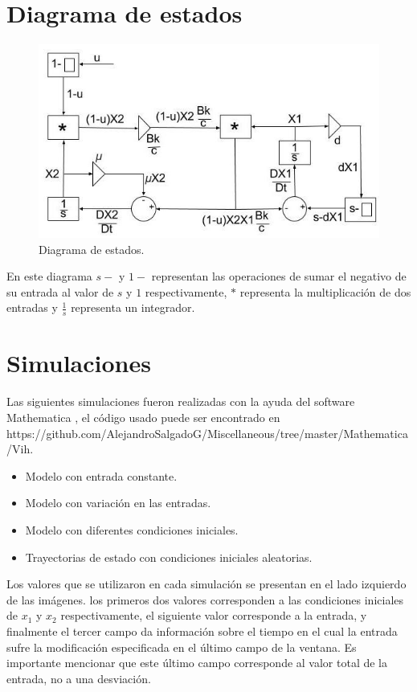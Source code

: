 \documentclass{article}
\begin{document}
\section{Diagrama de estados}

\begin{figure}[h!]
    \centering
    \includegraphics[width=\textwidth]{Images/State-diagram.jpeg}
    \caption{Diagrama de estados.}
    \label{fig:state-diagram}
\end{figure}

En este diagrama $s -$ y $1-$ representan las operaciones de sumar el negativo
de su entrada al valor de $s$ y $1$ respectivamente, $*$ representa la
multiplicación de dos entradas y $\frac{1}{s}$ representa un integrador.

\section{Simulaciones}

Las siguientes simulaciones fueron realizadas con la ayuda del software Mathematica
\cite{mathematica}, el código usado puede ser encontrado en
https://github.com/AlejandroSalgadoG/Miscellaneous/tree/master/Mathematica/Vih.

\begin{itemize}
    \item Modelo con entrada constante.
    \item Modelo con variación en las entradas.
    \item Modelo con diferentes condiciones iniciales.
    \item Trayectorias de estado con condiciones iniciales aleatorias.
\end{itemize}

Los valores que se utilizaron en cada simulación se presentan en el lado
izquierdo de las imágenes. los primeros dos valores corresponden a las
condiciones iniciales de $x_1$ y $x_2$ respectivamente, el siguiente valor
corresponde a la entrada, y finalmente el tercer campo da información sobre el
tiempo en el cual la entrada sufre la modificación especificada en el último
campo de la ventana. Es importante mencionar que este último campo corresponde al valor
total de la entrada, no a una desviación.
\end{document}
